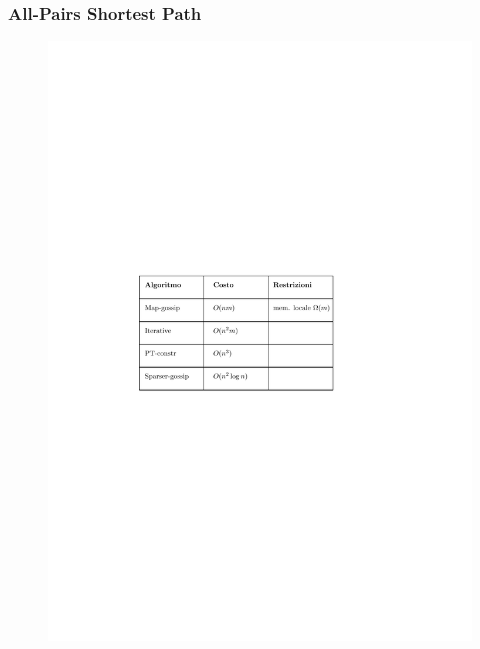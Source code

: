 \documentclass[10pt,xcolor=dvipsnames]{beamer}
\begin{document}
\begin{frame}
	\frametitle{All-Pairs Shortest Path}
	
	\begin{figure}[h]
	\centering
	\includegraphics[scale=1]{results_table.pdf}
	\end{figure}
\end{frame}
\end{document}
